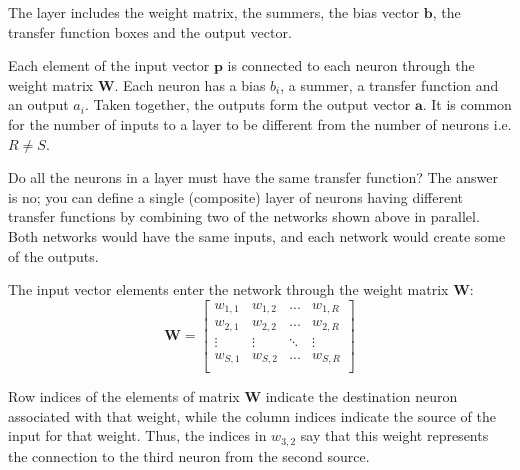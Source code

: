 \documentclass[12pt, a4paper, twoside]{report}
\begin{document}
The layer includes the weight matrix, the summers, the bias vector $\mathbf{b}$, the transfer function boxes and the output vector.
\par
Each element of the input vector $\mathbf{p}$ is connected to each neuron through the weight matrix $\mathbf{W}$. Each neuron has a bias $b_i$, a summer, a transfer function and an output $a_i$. Taken together, the outputs form the output vector $\mathbf{a}$. It is common for the number of inputs to a layer to be different from the number of neurons i.e. $R \neq S$.
\par
Do all the neurons in a layer must have the same transfer function? The answer is no; you can define a single (composite) layer of neurons having different transfer functions by combining two of the networks shown above in parallel. Both networks would have the same inputs, and each network would create some of the outputs.
\par
The input vector elements enter the network through the weight matrix $\mathbf{W}$:
\begin{equation}
\mathbf{W} = \begin{bmatrix}
w_{1,1} & w_{1,2} & ... & w_{1,R} \\ 
w_{2,1} & w_{2,2} & ... & w_{2,R} \\ 
 \vdots & \vdots & \ddots & \vdots \\ 
w_{S,1} & w_{S,2} & ... & w_{S,R}\\ 
\end{bmatrix}
\end{equation}

Row indices of the elements of matrix $\mathbf{W}$ indicate the destination neuron associated with that weight, while the column indices indicate the source of the input for that weight. Thus, the indices in $w_{3,2}$ say that this weight represents the connection to the third neuron from the second source.
\end{document}
